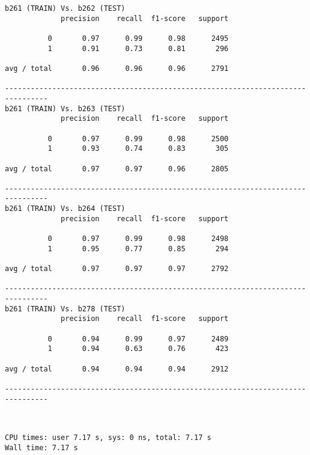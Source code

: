 \documentclass[11pt]{article}
\begin{document}
    \begin{Verbatim}[commandchars=\\\{\}]
b261 (TRAIN) Vs. b262 (TEST)
             precision    recall  f1-score   support

          0       0.97      0.99      0.98      2495
          1       0.91      0.73      0.81       296

avg / total       0.96      0.96      0.96      2791

--------------------------------------------------------------------------------
b261 (TRAIN) Vs. b263 (TEST)
             precision    recall  f1-score   support

          0       0.97      0.99      0.98      2500
          1       0.93      0.74      0.83       305

avg / total       0.97      0.97      0.96      2805

--------------------------------------------------------------------------------
b261 (TRAIN) Vs. b264 (TEST)
             precision    recall  f1-score   support

          0       0.97      0.99      0.98      2498
          1       0.95      0.77      0.85       294

avg / total       0.97      0.97      0.97      2792

--------------------------------------------------------------------------------
b261 (TRAIN) Vs. b278 (TEST)
             precision    recall  f1-score   support

          0       0.94      0.99      0.97      2489
          1       0.94      0.63      0.76       423

avg / total       0.94      0.94      0.94      2912

--------------------------------------------------------------------------------

    \end{Verbatim}

    \begin{center}
    \end{center}
    { \hspace*{\fill} \\}
    
    \begin{Verbatim}[commandchars=\\\{\}]
CPU times: user 7.17 s, sys: 0 ns, total: 7.17 s
Wall time: 7.17 s

    \end{Verbatim}
\end{document}
